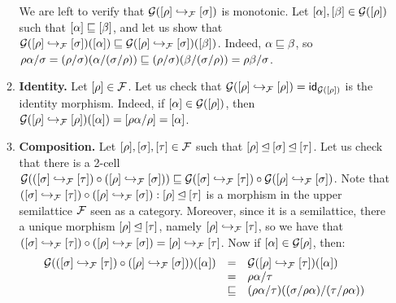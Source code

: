 \begin{enumerate}
\begin{enumerate}
    We are left to verify that $\mathcal{G}({[\rho]} \hookrightarrow_{\mathcal{F}} {[\sigma]})$ is monotonic.
    Let ${[\alpha]}, {[\beta]} \in \mathcal{G}([\rho])$
    such that ${[\alpha]} \sqsubseteq {[\beta]}$, and let us show that
    $\mathcal{G}({[\rho]} \hookrightarrow_{\mathcal{F}} {[\sigma]})({[\alpha]}) \sqsubseteq \mathcal{G}([\rho] \hookrightarrow_{\mathcal{F}} [\sigma])({[\beta]})$.
    Indeed, $\alpha \sqsubseteq \beta$, so
    $
      \rho\alpha/\sigma
      = (\rho/\sigma)(\alpha/(\sigma/\rho))
      \sqsubseteq (\rho/\sigma)(\beta/(\sigma/\rho))
      = \rho\beta/\sigma
    $.
  \item {\bf Identity.}
    Let ${[\rho]} \in \mathcal{F}$.
    Let us check that $\mathcal{G}({[\rho]} \hookrightarrow_{\mathcal{F}} {[\rho]}) = \mathsf{id}_{\mathcal{G}({[\rho]})}$
    is the identity morphism.
    Indeed, if ${[\alpha]} \in \mathcal{G}({[\rho]})$,
    then $\mathcal{G}({[\rho]} \hookrightarrow_{\mathcal{F}} {[\rho]})({[\alpha]}) = {[\rho\alpha/\rho]} = {[\alpha]}$.
  \item {\bf Composition.}
    Let ${[\rho]}, {[\sigma]}, {[\tau]} \in \mathcal{F}$
    such that ${[\rho]} \unlhd {[\sigma]} \unlhd {[\tau]}$.
    Let us check that there is a 2-cell
    $\mathcal{G}(({[\sigma]} \hookrightarrow_{\mathcal{F}} {[\tau]}) \circ ({[\rho]} \hookrightarrow_{\mathcal{F}} {[\sigma]})) \sqsubseteq
     \mathcal{G}({[\sigma]} \hookrightarrow_{\mathcal{F}} {[\tau]}) \circ \mathcal{G}({[\rho]} \hookrightarrow_{\mathcal{F}} {[\sigma]})$.
    Note that
    $({[\sigma]} \hookrightarrow_{\mathcal{F}} {[\tau]}) \circ ({[\rho]} \hookrightarrow_{\mathcal{F}} {[\sigma]}) : {[\rho]} \unlhd {[\tau]}$
    is a morphism in the upper semilattice $\mathcal{F}$ seen as a category.
    Moreover, since it is a semilattice, there a unique morphism ${[\rho]} \unlhd {[\tau]}$,
    namely ${[\rho]} \hookrightarrow_{\mathcal{F}} {[\tau]}$, so we have that
    $
      ({[\sigma]} \hookrightarrow_{\mathcal{F}} {[\tau]}) \circ ({[\rho]} \hookrightarrow_{\mathcal{F}} {[\sigma]}) = {[\rho]} \hookrightarrow_{\mathcal{F}} {[\tau]}
    $.
    Now if ${[\alpha]} \in \mathcal{G}{{[\rho]}}$, then:
    \[
      \begin{array}{rcll}
      \mathcal{G}(({[\sigma]} \hookrightarrow_{\mathcal{F}} {[\tau]}) \circ ({[\rho]} \hookrightarrow_{\mathcal{F}} {[\sigma]}))({[\alpha]})
      & = & \mathcal{G}({[\rho]} \hookrightarrow_{\mathcal{F}} {[\tau]})({[\alpha]}) \\
      & = & \rho\alpha/\tau \\
      & \sqsubseteq & (\rho\alpha/\tau)((\sigma/\rho\alpha)/(\tau/\rho\alpha)) \\

\end{array}\]
\end{enumerate}
\end{enumerate}
